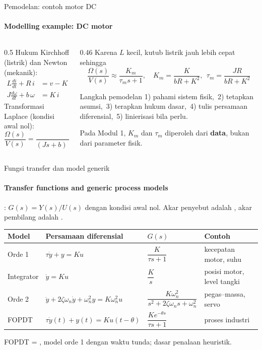 \documentclass[aspectratio=169,10pt]{beamer}
\begin{document}
\begin{frame}{Pemodelan: contoh motor DC}
	\framesubtitle{Modelling example: DC motor}
	\begin{columns}[T]
		\begin{column}{0.5\textwidth}
			\small
			Hukum Kirchhoff (listrik) dan Newton (mekanik):
			\begin{align*}
				L\frac{di}{dt} + R\,i &= v - K\,\omega \\
				J\frac{d\omega}{dt} + b\,\omega &= K\,i
			\end{align*}
			Transformasi Laplace (kondisi awal nol):
			\[
				\frac{\Omega(s)}{V(s)} = \frac{K}{(Js+b)(Ls+R)+K^2}
			\]
		\end{column}
		\begin{column}{0.46\textwidth}
			\small
			Karena $L$ kecil, kutub listrik jauh lebih cepat sehingga
			\[
				\frac{\Omega(s)}{V(s)} \approx \frac{K_m}{\tau_m s + 1},\quad
				K_m = \frac{K}{bR+K^2},\ \ \tau_m = \frac{JR}{bR+K^2}
			\]
			\begin{block}{Langkah pemodelan}
				\scriptsize
				1) pahami sistem fisik,\ 2) tetapkan asumsi,\ 3) terapkan hukum dasar,\ 4) tulis persamaan diferensial,\ 5) linierisasi bila perlu.
			\end{block}
			{\scriptsize Pada Modul 1, $K_m$ dan $\tau_m$ diperoleh dari \textbf{data}, bukan dari parameter fisik.}
		\end{column}
	\end{columns}
\end{frame}

\begin{frame}{Fungsi transfer dan model generik}
	\framesubtitle{Transfer functions and generic process models}
	\small
	: $G(s) = Y(s)/U(s)$ dengan kondisi awal nol. Akar penyebut adalah , akar pembilang adalah .

	\vspace{0.25cm}
	\renewcommand{\arraystretch}{2.0}
	\begin{tabular}{@{}l l l l@{}}
		\toprule
		\textbf{Model} & \textbf{Persamaan diferensial} & \textbf{$G(s)$} & \textbf{Contoh} \\
		\midrule
		Orde 1 & $\tau\dot y + y = K u$ & $\dfrac{K}{\tau s+1}$ & kecepatan motor, suhu \\
		Integrator & $\dot y = K u$ & $\dfrac{K}{s}$ & posisi motor, level tangki \\
		Orde 2 & $\ddot y + 2\zeta\omega_n\dot y + \omega_n^2 y = K\omega_n^2 u$ & $\dfrac{K\omega_n^2}{s^2+2\zeta\omega_n s+\omega_n^2}$ & pegas--massa, servo \\
		FOPDT & $\tau\dot y(t) + y(t) = K u(t-\theta)$ & $\dfrac{K e^{-\theta s}}{\tau s+1}$ & proses industri \\
		\bottomrule
	\end{tabular}

	\vspace{0.25cm}
	{\footnotesize FOPDT = , model orde 1 dengan waktu tunda; dasar penalaan heuristik.}
\end{frame}
\end{document}
